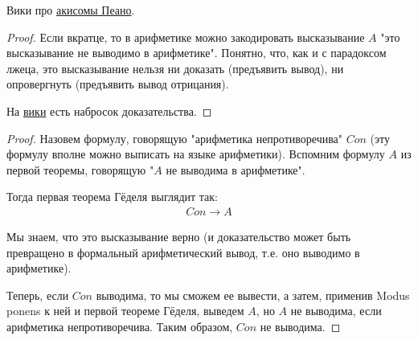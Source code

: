 
Вики про \href{https://ru.wikipedia.org/wiki/%D0%90%D0%BA%D1%81%D0%B8%D0%BE%D0%BC%D1%8B_%D0%9F%D0%B5%D0%B0%D0%BD%D0%BE}{акисомы Пеано}.

\begin{proof}
	Если вкратце, то в арифметике можно закодировать высказывание $A$ "это высказывание не выводимо в арифметике". Понятно, что, как и с парадоксом лжеца, это высказывание нельзя ни доказать (предъявить вывод), ни опровергнуть (предъявить вывод отрицания).
	
	На \href{https://ru.wikipedia.org/wiki/%D0%A2%D0%B5%D0%BE%D1%80%D0%B5%D0%BC%D0%B0_%D0%93%D1%91%D0%B4%D0%B5%D0%BB%D1%8F_%D0%BE_%D0%BD%D0%B5%D0%BF%D0%BE%D0%BB%D0%BD%D0%BE%D1%82%D0%B5}{вики} есть набросок доказательства.
\end{proof}

\begin{proof}
	Назовем формулу, говорящую "арифметика непротиворечива" $Con$ (эту формулу вполне можно выписать на языке арифметики). Вспомним формулу $A$ из первой теоремы, говорящую "$A$ не выводима в арифметике".
	
	Тогда первая теорема Гёделя выглядит так:
	\begin{align*}
		Con \rightarrow A
	\end{align*}
	
	Мы знаем, что это высказывание верно (и доказательство может быть превращено в формальный арифметический вывод, т.е. оно выводимо в арифметике). 
	
	Теперь, если $Con$ выводима, то мы сможем ее вывести, а затем, применив Modus ponens к ней и первой теореме Гёделя, выведем $A$, но $A$ не выводима, если арифметика непротиворечива. Таким образом, $Con$ не выводима.
\end{proof}